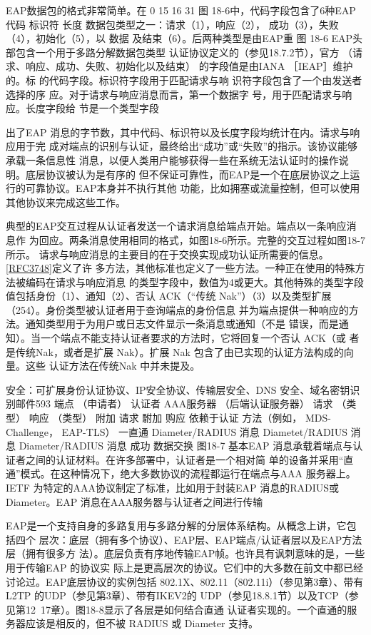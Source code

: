 EAP数据包的格式非常简单。在
0
15 16
31
图 18-6中，代码字段包含了6种EAP
代码
标识符
长度
数据包类型之一：请求（1），响应（2），
成功（3），失败（4），初始化（5），以
数据
及结束（6）。后两种类型是由EAP重
图 18-6
EAP头部包含一个用于多路分解数据包类型
认证协议定义的（参见18.7.2节），官方
（请求、响应、成功、失败、初始化以及结束）
的字段值是由IANA ［IEAP］维护的。标
的代码字段。标识符字段用于匹配请求与响
识符字段包含了一个由发送者选择的序
应。对于请求与响应消息而言，第一个数据字
号，用于匹配请求与响应。长度字段给
节是一个类型字段

出了EAP 消息的字节数，其中代码、标识符以及长度字段均统计在内。请求与响应用于完
成对端点的识别与认证，最终给出“成功”或“失败”的指示。该协议能够承载一条信息性
消息，以便人类用户能够获得一些在系统无法认证时的操作说明。底层协议被认为是有序的
但不保证可靠性，而EAP是一个在底层协议之上运行的可靠协议。EAP本身并不执行其他
功能，比如拥塞或流量控制，但可以使用其他协议来完成这些工作。

典型的EAP交互过程从认证者发送一个请求消息给端点开始。端点以一条响应消息作
为回应。两条消息使用相同的格式，如图18-6所示。完整的交互过程如图18-7所示。
请求与响应消息的主要目的在于交换实现成功认证所需要的信息。\href{https://www.rfc-editor.org/rfc/rfc3748}{[RFC3748]}定义了许
多方法，其他标准也定义了一些方法。一种正在使用的特殊方法被编码在请求与响应消息
的类型字段中，数值为4或更大。其他特殊的类型字段值包括身份（1）、通知（2）、否认
ACK（“传统 Nak”）（3）以及类型扩展（254）。身份类型被认证者用于查询端点的身份信息
并为端点提供一种响应的方法。通知类型用于为用户或日志文件显示一条消息或通知（不是
错误，而是通知）。当一个端点不能支持认证者要求的方法时，它将回复一个否认 ACK（或
者是传统Nak，或者是扩展 Nak）。扩展 Nak 包含了由已实现的认证方法构成的向量。这些
认证方法在传统Nak 中并未提及。

安全：可扩展身份认证协议、IP安全协议、传输层安全、DNS 安全、域名密钥识别邮件593
端点
（申请者）
认证者
AAA服务器
（后端认证服务器）
请求
（类型）
响应
（类型）
附加
请求
駙加
购应
依赖于认证
方法（例如，
MDS-Challenge，
EAP-TLS）
一直通
Diameter/RADIUS
消息
Diametet/RADIUS
消息
Diameter/RADIUS
消息
成功
数据交换
图18-7
基本EAP 消息承载着端点与认证者之间的认证材料。在许多部署中，认证者是一个相对简
单的设备并采用“直通”模式。在这种情况下，绝大多数协议的流程都运行在端点与AAA
服务器上。IETF 为特定的AAA协议制定了标准，比如用于封装EAP 消息的RADIUS或
Diameter。EAP 消息在AAA服务器与认证者之间进行传输

EAP是一个支持自身的多路复用与多路分解的分层体系结构。从概念上讲，它包括四个
层次：底层（拥有多个协议）、EAP层、EAP端点/认证者层以及EAP方法层（拥有很多方
法）。底层负责有序地传输EAP帧。也许具有讽刺意味的是，一些用于传输EAP 的协议实
际上是更高层次的协议。它们中的大多数在前文中都已经讨论过。EAP底层协议的实例包括
802.1X、802.11（802.11i）（参见第3章）、带有L2TP 的UDP（参见第3章）、带有IKEV2的
UDP（参见18.8.1节）以及TCP（参见第12~17章）。图18-8显示了各层是如何结合直通
认证者实现的。一个直通的服务器应该是相反的，但不被 RADIUS 或 Diameter 支持。

